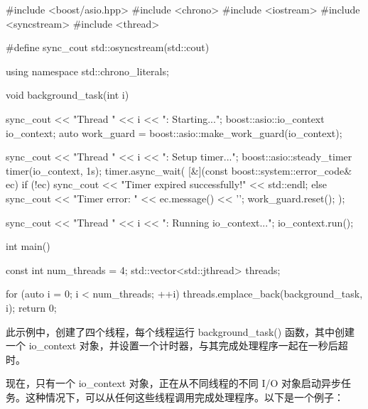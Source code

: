\begin{cpp}
#include <boost/asio.hpp>
#include <chrono>
#include <iostream>
#include <syncstream>
#include <thread>

#define sync_cout std::osyncstream(std::cout)

using namespace std::chrono_literals;

void background_task(int i) {
    sync_cout << "Thread " << i << ": Starting...\n";
    boost::asio::io_context io_context;
    auto work_guard =
                boost::asio::make_work_guard(io_context);

    sync_cout << "Thread " << i << ": Setup timer...\n";
    boost::asio::steady_timer timer(io_context, 1s);
    timer.async_wait(
        [&](const boost::system::error_code& ec) {
        if (!ec) {
            sync_cout << "Timer expired successfully!"
                      << std::endl;
        } else {
            sync_cout << "Timer error: "
                      << ec.message() << '\n';
        }
        work_guard.reset();
    });

    sync_cout << "Thread " << i << ": Running io_context...\n";
    io_context.run();
}

int main() {
    const int num_threads = 4;
    std::vector<std::jthread> threads;

    for (auto i = 0; i < num_threads; ++i) {
        threads.emplace_back(background_task, i);
    }
    return 0;
}
\end{cpp}

此示例中，创建了四个线程，每个线程运行 background\_task() 函数，其中创建一个 io\_context 对象，并设置一个计时器，与其完成处理程序一起在一秒后超时。


现在，只有一个 io\_context 对象，正在从不同线程的不同 I/O 对象启动异步任务。这种情况下，可以从任何这些线程调用完成处理程序。以下是一个例子：

